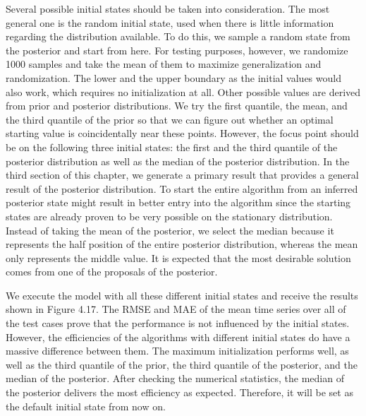 Several possible initial states should be taken into consideration. The most general one is the random initial state, used when there is little information regarding the distribution available. To do this, we sample a random state from the posterior and start from here. For testing purposes, however, we randomize 1000 samples and take the mean of them to maximize generalization and randomization. The lower and the upper boundary as the initial values would also work, which requires no initialization at all. Other possible values are derived from prior and posterior distributions. We try the first quantile, the mean, and the third quantile of the prior so that we can figure out whether an optimal starting value is coincidentally near these points. However, the focus point should be on the following three initial states: the first and the third quantile of the posterior distribution as well as the median of the posterior distribution. In the third section of this chapter, we generate a primary result that provides a general result of the posterior distribution. To start the entire algorithm from an inferred posterior state might result in better entry into the algorithm since the starting states are already proven to be very possible on the stationary distribution. Instead of taking the mean of the posterior, we select the median because it represents the half position of the entire posterior distribution, whereas the mean only represents the middle value. It is expected that the most desirable solution comes from one of the proposals of the posterior.

We execute the model with all these different initial states and receive the results shown in Figure 4.17. The RMSE and MAE of the mean time series over all of the test cases prove that the performance is not influenced by the initial states. However, the efficiencies of the algorithms with different initial states do have a massive difference between them. The maximum initialization performs well, as well as the third quantile of the prior, the third quantile of the posterior, and the median of the posterior. After checking the numerical statistics, the median of the posterior delivers the most efficiency as expected. Therefore, it will be set as the default initial state from now on.

